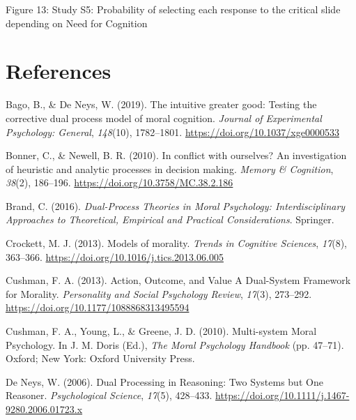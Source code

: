 \documentclass[
  man,floatsintext]{apa6}
\newlength{\cslhangindent}
\newlength{\cslentryspacingunit} %
\newenvironment{CSLReferences}[2] %
 {%
  \setlength{\parindent}{0pt}
  \ifodd #1
  \let\oldpar\par
  \def\par{\hangindent=\cslhangindent\oldpar}
  \fi
  \setlength{\parskip}{#2\cslentryspacingunit}
 }%
 {}
\begin{document}
Figure 13: Study S5: Probability of selecting each response to the critical slide depending on Need for Cognition

\hypertarget{references}{%
\section{References}\label{references}}

\setlength{\parindent}{-0.5in}
\setlength{\leftskip}{0.5in}
\setlength{\parskip}{8pt}

\hypertarget{refs}{}
\begin{CSLReferences}{1}{0}
\leavevmode{}%
Bago, B., \& De Neys, W. (2019). The intuitive greater good: {Testing} the corrective dual process model of moral cognition. \emph{Journal of Experimental Psychology: General}, \emph{148}(10), 1782--1801. \url{https://doi.org/10.1037/xge0000533}

\leavevmode{}%
Bonner, C., \& Newell, B. R. (2010). In conflict with ourselves? {An} investigation of heuristic and analytic processes in decision making. \emph{Memory \& Cognition}, \emph{38}(2), 186--196. \url{https://doi.org/10.3758/MC.38.2.186}

\leavevmode{}%
Brand, C. (2016). \emph{Dual-{Process Theories} in {Moral Psychology}: {Interdisciplinary Approaches} to {Theoretical}, {Empirical} and {Practical Considerations}}. {Springer}.

\leavevmode{}%
Crockett, M. J. (2013). Models of morality. \emph{Trends in Cognitive Sciences}, \emph{17}(8), 363--366. \url{https://doi.org/10.1016/j.tics.2013.06.005}

\leavevmode{}%
Cushman, F. A. (2013). Action, {Outcome}, and {Value A Dual-System Framework} for {Morality}. \emph{Personality and Social Psychology Review}, \emph{17}(3), 273--292. \url{https://doi.org/10.1177/1088868313495594}

\leavevmode{}%
Cushman, F. A., Young, L., \& Greene, J. D. (2010). Multi-system {Moral Psychology}. In J. M. Doris (Ed.), \emph{The {Moral Psychology Handbook}} (pp. 47--71). {Oxford; New York}: {Oxford University Press}.

\leavevmode{}%
De Neys, W. (2006). Dual {Processing} in {Reasoning}: {Two Systems} but {One Reasoner}. \emph{Psychological Science}, \emph{17}(5), 428--433. \url{https://doi.org/10.1111/j.1467-9280.2006.01723.x}


\end{CSLReferences}
\end{document}
